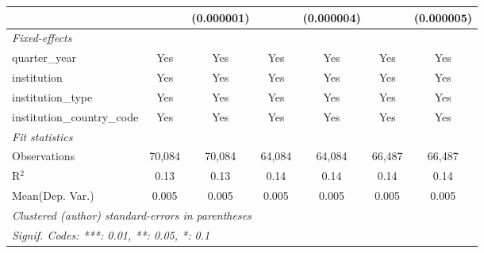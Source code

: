 \begin{tabular}{lcccccc}
                                      &               & (0.000001)    &          & (0.000004) &                & (0.000005)\\   
   \midrule
   \emph{Fixed-effects}\\
   quarter\_year                      & Yes           & Yes           & Yes      & Yes        & Yes            & Yes\\  
   institution                        & Yes           & Yes           & Yes      & Yes        & Yes            & Yes\\  
   institution\_type                  & Yes           & Yes           & Yes      & Yes        & Yes            & Yes\\  
   institution\_country\_code         & Yes           & Yes           & Yes      & Yes        & Yes            & Yes\\  
   \midrule
   \emph{Fit statistics}\\
   Observations                       & 70,084        & 70,084        & 64,084   & 64,084     & 66,487         & 66,487\\  
   R$^2$                              & 0.13          & 0.13          & 0.14     & 0.14       & 0.14           & 0.14\\  
Mean(Dep. Var.) & 0.005 & 0.005 & 0.005 & 0.005 & 0.005 & 0.005 \\
   \midrule \midrule
   \multicolumn{7}{l}{\emph{Clustered (author) standard-errors in parentheses}}\\
   \multicolumn{7}{l}{\emph{Signif. Codes: ***: 0.01, **: 0.05, *: 0.1}}\\
\end{tabular}
\par\endgroup
